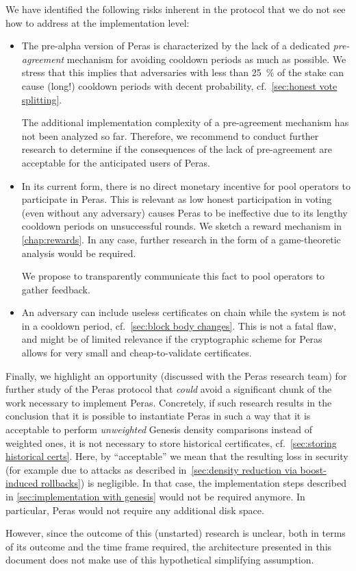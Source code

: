 We have identified the following risks inherent in the protocol that we do not see how to address at the implementation level:
\begin{itemize}
\item
  The pre-alpha version of Peras is characterized by the lack of a dedicated \emph{pre-agreement} mechanism for avoiding cooldown periods as much as possible.
  We stress that this implies that adversaries with less than \qty{25}{\percent} of the stake can cause (long!) cooldown periods with decent probability, cf.~\cref{sec:honest vote splitting}.

  The additional implementation complexity of a pre-agreement mechanism has not been analyzed so far.
  Therefore, we recommend to conduct further research to determine if the consequences of the lack of pre-agreement are acceptable for the anticipated users of Peras.
\item
  In its current form, there is no direct monetary incentive for pool operators to participate in Peras.
  This is relevant as low honest participation in voting (even without any adversary) causes Peras to be ineffective due to its lengthy cooldown periods on unsuccessful rounds.
  We sketch a reward mechanism in \cref{chap:rewards}.
  In any case, further research in the form of a game-theoretic analysis would be required.

  We propose to transparently communicate this fact to pool operators to gather feedback.
\item
  An adversary can include useless certificates on chain while the system is not in a cooldown period, cf.~\cref{sec:block body changes}.
  This is not a fatal flaw, and might be of limited relevance if the cryptographic scheme for Peras allows for very small and cheap-to-validate certificates.
\end{itemize}

Finally, we highlight an opportunity (discussed with the Peras research team) for further study of the Peras protocol that \emph{could} avoid a significant chunk of the work necessary to implement Peras.
Concretely, if such research results in the conclusion that it is possible to instantiate Peras in such a way that it is acceptable to perform \emph{unweighted} Genesis density comparisons instead of weighted ones, it is not necessary to store historical certificates, cf.~\cref{sec:storing historical certs}.
Here, by \enquote{acceptable} we mean that the resulting loss in security (for example due to attacks as described in~\cref{sec:density reduction via boost-induced rollbacks}) is negligible.
In that case, the implementation steps described in \cref{sec:implementation with genesis} would not be required anymore.
In particular, Peras would not require any additional disk space.

However, since the outcome of this (unstarted) research is unclear, both in terms of its outcome and the time frame required, the architecture presented in this document does not make use of this hypothetical simplifying assumption.

